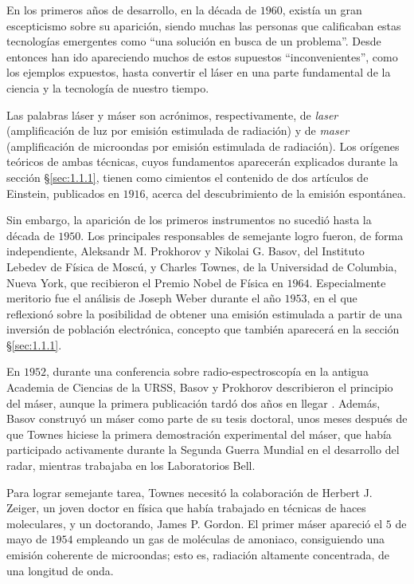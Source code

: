 En los primeros años de desarrollo, en la década de $1960$, existía un gran escepticismo \autocite{SanchezRon2022} sobre su aparición, siendo muchas las personas que calificaban estas tecnologías emergentes como \enquote{una solución en busca de un problema}. Desde entonces han ido apareciendo muchos de estos supuestos \enquote{inconvenientes}, como los ejemplos expuestos, hasta convertir el láser en una parte fundamental de la ciencia y la tecnología de nuestro tiempo.  

Las palabras láser y máser son acrónimos, respectivamente, de \emph{\acrfull{laser}} (amplificación de luz por emisión estimulada de radiación) y de \emph{\acrfull{maser}} (amplificación de microondas por emisión estimulada de radiación). Los orígenes teóricos de ambas técnicas, cuyos fundamentos aparecerán explicados durante la sección \S\ref{sec:1.1.1}, tienen como cimientos el contenido de dos artículos de Einstein\autocite{Einstein1916,Einstein1916a}, publicados en $1916$, acerca del descubrimiento de la emisión espontánea.

Sin embargo, la aparición de los primeros instrumentos no sucedió hasta la década de $1950$. Los principales responsables de semejante logro fueron, de forma independiente, Aleksandr M. Prokhorov y Nikolai G. Basov, del Instituto Lebedev de Física de Moscú, y Charles Townes, de la Universidad de Columbia, Nueva York, que recibieron el Premio Nobel de Física en $1964$. Especialmente meritorio fue el análisis de Joseph Weber \autocite{Weber1953a} durante el año $1953$, en el que reflexionó sobre la posibilidad de obtener una emisión estimulada a partir de una inversión de población electrónica, concepto que también aparecerá en la sección \S\ref{sec:1.1.1}.

En $1952$, durante una conferencia \autocite{SanchezRon2014} sobre radio-espectroscopía en la antigua Academia de Ciencias de la URSS, Basov y Prokhorov describieron el principio del máser, aunque la primera publicación tardó dos años en llegar \autocite{Basov1954}. Además, Basov construyó un máser como parte de su tesis doctoral, unos meses después de que Townes hiciese la primera demostración experimental del máser, que había participado activamente durante la Segunda Guerra Mundial en el desarrollo del radar, mientras trabajaba en los Laboratorios Bell.

Para lograr semejante tarea, Townes necesitó la colaboración de Herbert J. Zeiger, un joven doctor en física que había trabajado en técnicas de haces moleculares, y un doctorando, James P. Gordon. El primer máser apareció el $5$ de mayo de $1954$ empleando un gas de moléculas de amoniaco\autocite{Gordon1954}, consiguiendo una emisión coherente de microondas; esto es, radiación altamente concentrada, de una longitud de onda. 

